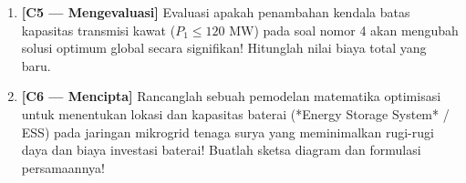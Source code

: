 \documentclass[11pt,a4paper]{article}
\begin{document}
\begin{enumerate}[label=\textbf{Soal \arabic*:}, leftmargin=*, resume]
    \item \textbf{[C5 --- Mengevaluasi]} Evaluasi apakah penambahan kendala batas kapasitas transmisi kawat ($P_1 \le 120\text{ MW}$) pada soal nomor 4 akan mengubah solusi optimum global secara signifikan! Hitunglah nilai biaya total yang baru.
    
    \begin{tcolorbox}[colback=white,colframe=gray!50,height=4.5cm,title=Ruang Jawaban Soal 5]
    \end{tcolorbox}

    \item \textbf{[C6 --- Mencipta]} Rancanglah sebuah pemodelan matematika optimisasi untuk menentukan lokasi dan kapasitas baterai (*Energy Storage System* / ESS) pada jaringan mikrogrid tenaga surya yang meminimalkan rugi-rugi daya dan biaya investasi baterai! Buatlah sketsa diagram dan formulasi persamaannya!
    
    \begin{tcolorbox}[colback=white,colframe=gray!50,height=6.5cm,title=Ruang Jawaban Soal 6]
    \end{tcolorbox}
\end{enumerate}
\end{document}
